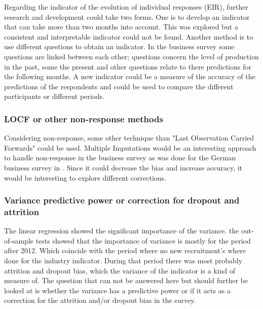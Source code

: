 \documentclass[12pt,a4paper,oneside]{book}
\begin{document}

Regarding the indicator of the evolution of individual responses (EIR), further research and development could take two forms. 
One is to develop an indicator that can take more than two months into account. This was explored but a consistent and interpretable indicator could not be found. 
Another method is to use different questions to obtain an indicator. In the business survey some questions are linked between each other; questions concern the level of production in the past, some the present and other questions relate to there predictions for the following months. 
A new indicator could be a measure of the accuracy of the predictions of the respondents and could be used to compare the different participants or different periods.


\subsubsection{LOCF or other non-response methods}
Considering non-response, some other technique than "Last Observation Carried Forwards" could be used. 
Multiple Imputations would be an interesting approach to handle non-response in the business survey as was done for the German business survey in \cite{seiler_microdata_2013}. 
Since it could decrease the bias and increase accuracy, it would be interesting to explore different corrections.


\subsubsection{Variance predictive power or correction for dropout and attrition}

The linear regression showed the significant importance of the variance. the out-of-sample tests showed that the importance of variance is mostly for the period after 2012. Which coincide with the period where no new recruitment's where done for the industry indicator. During that period there was most probably attrition and dropout bias, which the variance of the indicator is a kind of measure of. The question that can not be answered here but should further be looked at is whether the variance has a predictive power or if it acts as a correction for the attrition and/or dropout bias in the survey.
\end{document}
